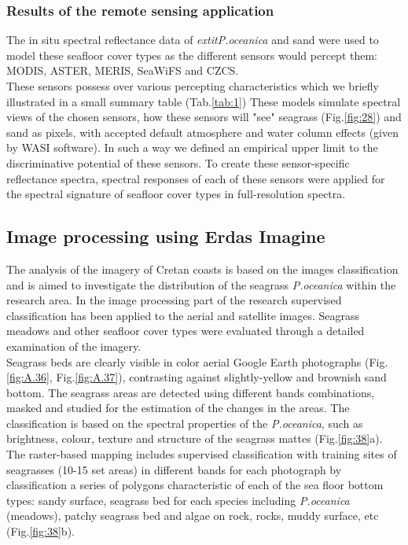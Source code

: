 \documentclass[10pt, a4paper]{article}
\begin{document}
\subsubsection{Results of the remote sensing application}
The in situ spectral reflectance data of \textit{	extit{P.oceanica}} and sand were used to model these seafloor cover
types as the different sensors would percept them: MODIS, ASTER, MERIS, SeaWiFS and CZCS.\\
These sensors possess over various percepting characteristics which we briefly illustrated in a small summary table (Tab.\ref{tab:1})
These models simulate spectral views of the chosen sensors, how these sensors will "see" seagrass (Fig.\ref{fig:28}) and sand as
pixels, with accepted default atmosphere and water column effects (given by WASI software). In such
a way we defined an empirical upper limit to the discriminative potential of these sensors. To create
these sensor-specific reflectance spectra, spectral responses of each of these sensors were applied for
the spectral signature of seafloor cover types in full-resolution spectra.

\subsection{Image processing using Erdas Imagine}
The analysis of the imagery of Cretan coasts is based on the images classification and is aimed to
investigate the distribution of the seagrass \textit{P.oceanica} within the research area.
In the image processing part of the research supervised classification has been applied to the aerial
and satellite images. Seagrass meadows and other seafloor cover types were evaluated through a
detailed examination of the imagery. \\
Seagrass beds are clearly visible in color aerial Google Earth
photographs (Fig.\ref{fig:A.36}, Fig.\ref{fig:A.37}), contrasting against slightly-yellow and brownish sand bottom. The seagrass areas are
detected using different bands combinations, masked and studied for the estimation of the changes in
the areas. The classification is based on the spectral properties of the \textit{P.oceanica}, such as brightness,
colour, texture and structure of the seagrass mattes (Fig.\ref{fig:38}a). The raster-based mapping
includes supervised classification with training sites of seagrasses (10-15 set areas) in different bands
for each photograph by classification a series of polygons characteristic of each of the sea floor
bottom types: sandy surface, seagrass bed for each species including \textit{P.oceanica} (meadows), patchy
seagrass bed and algae on rock, rocks, muddy surface, etc (Fig.\ref{fig:38}b).
\end{document}
